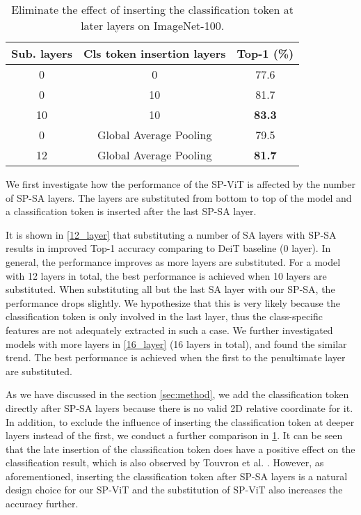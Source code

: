 \documentclass[authorversion, sigconf, acmthm=false, nonacm=true]{acmart}
\begin{document}
\begin{table}[ht]
  \caption{Eliminate the effect of inserting the classification token at later layers on ImageNet-100.}
  \centering
\begin{tabular}{ccc}
     \toprule
     Sub. layers  & Cls token insertion layers & Top-1 (\%)  \\
     \midrule
     0 & 0  &   77.6 \\

     0 & 10  &   81.7 \\

     10 & 10&    \textbf{83.3} \\
     \midrule

     0 & Global Average Pooling&    79.5 \\

     12 & Global Average Pooling&    \textbf{81.7} \\


     \bottomrule
  \end{tabular}
\label{table.compare}
  \end{table}


We first investigate how the performance of the SP-ViT is affected by the number of SP-SA layers. The layers are substituted from bottom to top of the model and a classification token is inserted after the last SP-SA layer.

It is shown in \cref{12_layer} that substituting a number of SA layers with SP-SA results in improved Top-1 accuracy comparing to DeiT baseline (0 layer). In general, the performance improves as more layers are substituted. For a model with 12 layers in total, the best performance is achieved when 10 layers are substituted. When substituting all but the last SA layer with our SP-SA, the performance drops slightly.
We hypothesize that this is very likely because the classification token is only involved in the last layer, thus the class-specific features are not adequately extracted in such a case. We further investigated models with more layers in \cref{16_layer} (16 layers in total), and found the similar trend. The best performance is achieved when the first to the penultimate layer are substituted. 



As we have discussed in the section \ref{sec:method}, 
we add the classification token directly after SP-SA layers 
because there is no valid 2D relative coordinate for it. 
In addition, to exclude the influence of inserting the classification token at deeper layers instead of the first, 
we conduct a further comparison in \cref{table.compare}. 
It can be seen that the late insertion of the classification token does have a positive effect on
the classification result, which is also observed by Touvron et al. \cite{touvron2021going}. 
However, as aforementioned, inserting the classification token after SP-SA layers is a natural design choice for our SP-ViT 
and the substitution of SP-ViT also increases the accuracy further. 
\end{document}
